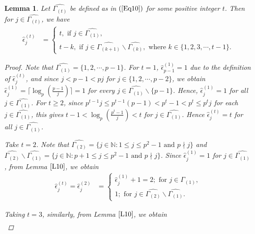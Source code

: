 \documentclass[pdflatex,sn-mathphys-num]{sn-jnl}%
\newtheorem{lemma}{Lemma}
\theoremstyle{thmstyleone}%
\theoremstyle{thmstyletwo}%
\theoremstyle{thmstylethree}%
\begin{document}
 \begin{lemma}\label{L11}
     Let $\widehat{\Gamma_{(t)}}$ be defined as in $(\ref{Eq10})$ for some positive integer $t$. Then for $j\in\widehat{\Gamma_{(t)}}$, we have
     \begin{align*}
         \hat{\epsilon}_{j}^{(t)} &= \begin{cases}
             t,\text{ if }j\in \widehat{\Gamma_{(1)}}, \\
             t-k,\text{ if }j\in\widehat{\Gamma_{(k+1)}}\backslash\widehat{\Gamma_{(k)}},\text{ where }k\in\{1,2,3,\cdots,t-1\}.
         \end{cases}
     \end{align*}
     \begin{proof}
         Note that $\widehat{\Gamma_{(1)}}=\{1,2,\cdots,p-1\}$. For $t=1$, $\hat{\epsilon}_{p-1}^{(1)}=1$ due to the definition of $\hat{\epsilon}_{j}^{(t)}$, and since $j<p-1<pj$ for $j\in\{1,2,\cdots,p-2\}$, we obtain $\hat{\epsilon}_{j}^{(1)}=\Big\lceil\operatorname{log}_{p}\left(\frac{p-1}{j}\right)\Big\rceil=1$ for every $j\in\widehat{\Gamma_{(1)}}\backslash\{p-1\}$. Hence, $\hat{\epsilon}_{j}^{(1)}=1$ for all $j\in\widehat{\Gamma_{(1)}}$.
          For $t\geq 2$, since $p^{t-1}j\leq p^{t-1}(p-1)<p^{t}-1<p^{t}\leq p^{t}j$ for each $j\in\widehat{\Gamma_{(1)}}$, this gives $t-1<\operatorname{log}_{p}\left(\frac{p^t-1}{j}\right)<t$ for $j\in\widehat{\Gamma_{(1)}}$. Hence $\hat{\epsilon}_{j}^{(t)}=t$ for all $j\in\widehat{\Gamma_{(1)}}$. 
          \par
          Take $t=2$. Note that $\widehat{\Gamma_{(2)}}=\{j\in\mathbb{N}:1\leq j\leq p^{2}-1\text{ and }p\nmid j\}$ and $\widehat{\Gamma_{(2)}}\backslash\widehat{\Gamma_{(1)}}=\{j\in\mathbb{N}:p+1\leq j\leq p^{2}-1\text{ and }p\nmid j\}$. Since $\hat{\epsilon}_{j}^{(1)}=1$ for $j\in\widehat{\Gamma_{(1)}}$, from Lemma $\ref{L10}$, we obtain 
          \begin{align*}
              \hat{\epsilon}_{j}^{(t)}=\hat{\epsilon}_{j}^{(2)} & =\begin{cases}
              \hat{\epsilon}_{j}^{(1)}+1=2;\text{ for }j\in\widehat{\Gamma_{(1)}} ,\\
              1;\text{ for }j\in\widehat{\Gamma_{(2)}}\backslash\widehat{\Gamma_{(1)}}.
          \end{cases}
          \end{align*}
         \par Taking $t=3$, similarly, from Lemma $\ref{L10}$, we obtain 
          \begin{align*}

\end{align*}
\end{proof}
\end{lemma}
\end{document}
